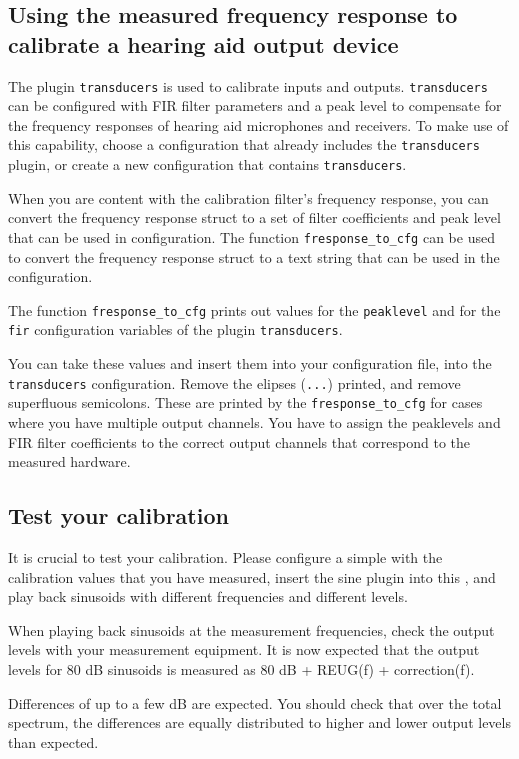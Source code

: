 \documentclass[11pt,a4paper,twoside]{article}
\newcommand{\+}{\discretionary{\mbox{\scriptsize$\hookleftarrow$}}{}{}}
\begin{document}
\subsection{Using the measured frequency response to calibrate a hearing aid output device}

The \mha{} plugin \texttt{transducers} is used to calibrate inputs and outputs.
%
\texttt{transducers} can be configured with FIR filter parameters and a peak level
to compensate for the frequency responses of hearing aid microphones and receivers.
%
To make use of this capability, choose a \mha{} configuration that already includes
the \texttt{transducers} plugin, or create a new configuration that contains
\texttt{transducers}.

When you are content with the calibration filter's frequency response,
you can convert the frequency response struct to a set of filter
coefficients and peak level that can be used in \mha{} configuration.
%
The \Matlab{} function \texttt{fresponse\_to\_cfg} can be used to convert the
frequency response struct to a text string that can be used in the \mha{}
configuration.

The function \texttt{fresponse\_to\_cfg} prints out values for the
\texttt{peaklevel} and for the \texttt{fir} configuration variables of
the \mha{} plugin \texttt{transducers}.

You can take these values and insert them into your configuration file,
into the \texttt{transducers} configuration.
%
Remove the elipses (\texttt{...}) printed, and remove superfluous
semicolons.
%
These are printed by the \texttt{fresponse\_to\_cfg} for cases where
you have multiple output channels. You have to assign the peaklevels
and FIR filter coefficients to the correct output channels that
correspond to the measured hardware.

\subsection{Test your calibration}

It is crucial to test your calibration. Please configure a simple \mha{} with the
calibration values that you have measured, insert the sine plugin into this \mha{},
and play back sinusoids with different frequencies and different levels.

When playing back sinusoids at the measurement frequencies, check the output levels with your
measurement equipment. It is now expected that the output levels for 80 dB sinusoids is measured as 80 dB + REUG(f) + correction(f).

Differences of up to a few dB are expected. You should check that over
the total spectrum, the differences are equally distributed to higher
and lower output levels than expected.



\printindex
\end{document}
